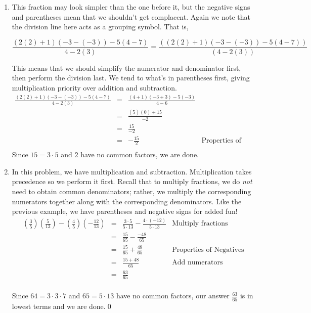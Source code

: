 \documentclass{ximera}
\begin{document}
\begin{example}
\begin{enumerate}
																					
\item  This fraction may look simpler than the one before it, but the negative signs and parentheses mean that we shouldn't get complacent.  Again we note that the division line here acts as a grouping symbol.  That is, 

\[ \frac{(2(2)+1)(-3-(-3)) - 5(4-7)}{4-2(3)} = \frac{\left((2(2)+1)(-3-(-3)) - 5(4-7) \right)}{(4-2(3))} \]

This means that we should simplify the numerator and denominator first, then perform the division last.  We tend to what's in parentheses first, giving multiplication priority over addition and subtraction.\[ \begin{array}{rclr}


\frac{(2(2)+1)(-3-(-3)) - 5(4-7)}{4-2(3)} & = & \frac{(4+1)(-3+3)-5(-3)}{4 - 6} &  \\  
                                           & = & \frac{(5)(0) + 15}{-2}  & \\  
																					 & = & \frac{15}{-2} & \\  
																					 & = & -\frac{15}{2} & \text{Properties of Negatives} \\ \end{array} \]
Since $15 = 3\cdot 5$ and $2$ have no common factors, we are done.
																			



\item  In this problem, we have multiplication and subtraction.  Multiplication takes precedence so we perform it first.  Recall that to multiply fractions, we do \textit{not} need to obtain common denominators;  rather, we multiply the corresponding numerators together along with the corresponding denominators.  Like the previous example, we have parentheses and negative signs for added fun!\[ \begin{array}{rclr}

\left(\frac{3}{5} \right) \left(\frac{5}{13} \right) - \left(\frac{4}{5}\right) \left( - \frac{12}{13}\right) & = & \frac{3 \cdot 5}{5 \cdot 13} - \frac{4\cdot (-12)}{5 \cdot 13} & \text{Multiply fractions}\\  

& = & \frac{15}{65} - \frac{-48}{65} & \\ 
& = & \frac{15}{65} + \frac{48}{65} & \text{Properties of Negatives}\\ 
& = & \frac{15+48}{65}  & \text{Add numerators} \\  
& = & \frac{63}{65}  & \\ \end{array} \]

Since $64 = 3 \cdot 3 \cdot 7$ and $65 = 5 \cdot 13$ have no common factors, our answer $\frac{63}{65}$ is in lowest terms and we are done.\qed

\end{enumerate}

\end{example} 
\end{document}
